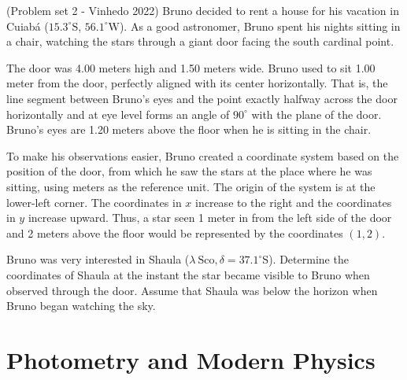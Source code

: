 \documentclass[11pt]{article}
\begin{document}
\begin{pproblem}(Problem set 2 - Vinhedo 2022) 
    Bruno decided to rent a house for his vacation in Cuiabá ($15.3^{\circ} \text{S}$, $56.1^{\circ} \text{W}$). As a good astronomer, Bruno spent his nights sitting in a chair, watching the stars through a giant door facing the south cardinal point.

    The door was 4.00 meters high and 1.50 meters wide. Bruno used to sit
    1.00 meter from the door, perfectly aligned with its center horizontally. That is, the line
    segment between Bruno's eyes and the point exactly halfway across the door horizontally and
    at eye level forms an angle of $90^{\circ}$ with the plane of the door. Bruno's eyes are
    1.20 meters above the floor when he is sitting in the chair.
    
    To make his observations easier, Bruno created a coordinate system based on the position of the
    door, from which he saw the stars at the place where he was sitting, using meters as
    the reference unit. The origin of the system is at the lower-left corner. The coordinates
    in $x$ increase to the right and the coordinates in $y$ increase upward. Thus, a
    star seen 1 meter in from the left side of the door and 2 meters above the floor would be represented
    by the coordinates $(1, 2)$.
    
    Bruno was very interested in Shaula ($\lambda \ \text{Sco}, \delta = 37.1^{\circ} \text{S}$). Determine the coordinates of
    Shaula at the instant the star became visible to Bruno when observed through the door. Assume that Shaula was below the horizon when Bruno began watching the sky.
    

\end{pproblem}

\newpage

\section{Photometry and Modern Physics}
\end{document}
